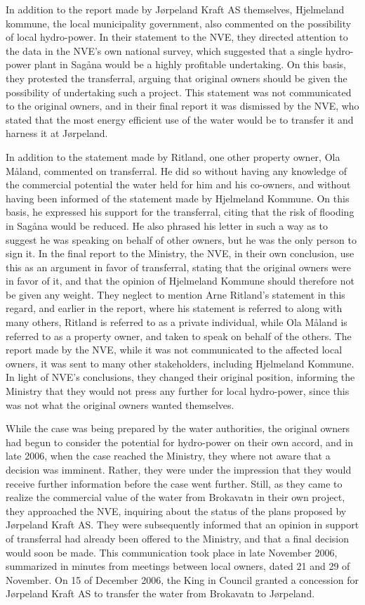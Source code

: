 In addition to the report made by Jørpeland Kraft AS themselves, Hjelmeland kommune, the local municipality government, also commented on the possibility of local hydro-power. In their statement to the NVE, they directed attention to the data in the NVE's own national survey, which suggested that a single hydro-power plant in Sagåna would be a highly profitable undertaking. On this basis, they protested the transferral, arguing that original owners should be given the possibility of undertaking such a project. This statement was not communicated to the original owners, and in their final report it was dismissed by the NVE, who stated that the most energy efficient use of the water would be to transfer it and harness it at Jørpeland.

In addition to the statement made by Ritland, one other property owner, Ola Måland, commented on transferral. He did so without having any knowledge of the commercial potential the water held for him and his co-owners, and without having been informed of the statement made by Hjelmeland Kommune. On this basis, he expressed his support for the transferral, citing that the risk of flooding in Sagåna would be reduced. He also phrased his letter in such a way as to suggest he was speaking on behalf of other owners, but he was the only person to sign it. In the final report to the Ministry, the NVE, in their own conclusion, use this as an argument in favor of transferral, stating that the original owners were in favor of it, and that the opinion of Hjelmeland Kommune should therefore not be given any weight. They neglect to mention Arne Ritland's statement in this regard, and earlier in the report, where his statement is referred to along with many others, Ritland is referred to as a private individual, while Ola Måland is referred to as a property owner, and taken to speak on behalf of the others. The report made by the NVE, while it was not communicated to the affected local owners, it was sent to many other stakeholders, including Hjelmeland Kommune. In light of NVE's conclusions, they changed their original position, informing the Ministry that they would not press any further for local hydro-power, since this was not what the original owners wanted themselves. 

While the case was being prepared by the water authorities, the original owners had begun to consider the potential for hydro-power on their own accord, and in late 2006, when the case reached the Ministry, they where not aware that a decision was imminent. Rather, they were under the impression that they would receive further information before the case went further. Still, as they came to realize the commercial value of the water from Brokavatn in their own project, they approached the NVE, inquiring about the status of the plans proposed by Jørpeland Kraft AS. They were subsequently informed that an opinion in support of transferral had already been offered to the Ministry, and that a final decision would soon be made. This communication took place in late November 2006, summarized in minutes from meetings between local owners, dated 21 and 29 of November. On 15 of December 2006, the King in Council granted a concession for Jørpeland Kraft AS to transfer the water from Brokavatn to Jørpeland.

